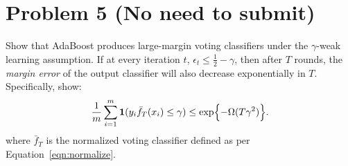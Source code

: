 \documentclass{article}
\newcommand*{\one}{{\bf 1}}
\begin{document}
\section*{Problem 5 (No need to submit)}
Show that AdaBoost produces large-margin voting classifiers under the $\gamma$-weak learning assumption. If at every iteration $t$, $\epsilon_t \leq \frac12 - \gamma$,
then after $T$ rounds, the {\em margin error} of the output classifier will also decrease
exponentially in $T$. Specifically, show:
\[
\frac1m \sum_{i=1}^m \one(y_i \bar{f}_T(x_i) \leq \gamma) \leq \exp{-\Omega(T\gamma^2)}.
\]
where $\bar{f}_T$ is the normalized voting classifier defined as per Equation~\eqref{eqn:normalize}.
\end{document}
